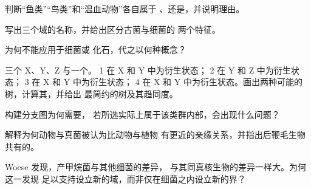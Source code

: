 \begin{exercise}[$\star$]\label{exo:b1:classifying-biodiversity:3}
判断“鱼类”“鸟类”和“温血动物”各自属于
、还是，并说明理由。
\end{exercise}

\begin{exercise}[$\star$]\label{exo:b1:classifying-biodiversity:4}
写出三个域的名称，并给出区分古菌与细菌的
两个特征。
\end{exercise}

\begin{exercise}[$\star\star$]\label{exo:b1:classifying-biodiversity:5}
为何不能应用于细菌或
化石，代之以何种概念？
\end{exercise}

\begin{exercise}[$\star\star$]\label{exo:b1:classifying-biodiversity:6}
三个 X、Y、Z 与一个。 1 在 X 和 Y 中为衍生状态；
 2 在 Y 和 Z 中为衍生状态； 3 在 X 和 Y 中为衍生状态； 4 在 X 和
Y 中为衍生状态。画出两种可能的树，计算其，并给出
最简约的树及其趋同度。
\end{exercise}

\begin{exercise}[$\star\star$]\label{exo:b1:classifying-biodiversity:7}
构建分支图为何需要，
若所选实际上属于该类群内部，会出现什么问题？
\end{exercise}

\begin{exercise}[$\star\star$]\label{exo:b1:classifying-biodiversity:8}
解释为何动物与真菌被认为比动物与植物
有更近的亲缘关系，并指出后鞭毛生物共有的。
\end{exercise}

\begin{exercise}[$\star\star$]\label{exo:b1:classifying-biodiversity:9}
Woese 发现，产甲烷菌与其他细菌的差异，
与其同真核生物的差异一样大。为何这一发现
足以支持设立新的域，而非仅在细菌之内设立新的界？
\end{exercise}

